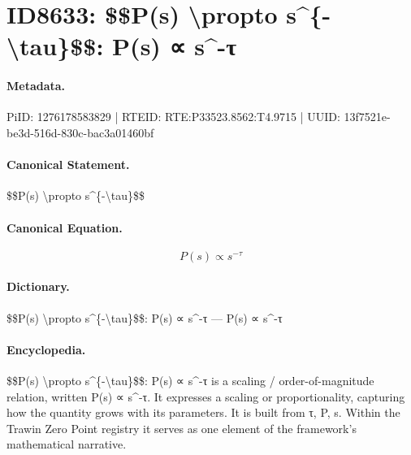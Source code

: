 \section*{ID8633: \$\$P(s) \textbackslash{}propto s\textasciicircum{}\{-\textbackslash{}tau\}\$\$: P(s) ∝ s\textasciicircum{}-τ}
\paragraph{Metadata.}
PiID: 1276178583829 | RTEID: RTE:P33523.8562:T4.9715 | UUID: 13f7521e-be3d-516d-830c-bac3a01460bf

\paragraph{Canonical Statement.}
\$\$P(s) \textbackslash{}propto s\textasciicircum{}\{-\textbackslash{}tau\}\$\$

\paragraph{Canonical Equation.}
\[
P(s) \propto s^{-\tau}
\]

\paragraph{Dictionary.}
\$\$P(s) \textbackslash{}propto s\textasciicircum{}\{-\textbackslash{}tau\}\$\$: P(s) ∝ s\textasciicircum{}-τ — P(s) ∝ s\textasciicircum{}-τ

\paragraph{Encyclopedia.}
\$\$P(s) \textbackslash{}propto s\textasciicircum{}\{-\textbackslash{}tau\}\$\$: P(s) ∝ s\textasciicircum{}-τ is a scaling / order-of-magnitude relation, written P(s) ∝ s\textasciicircum{}-τ. It expresses a scaling or proportionality, capturing how the quantity grows with its parameters. It is built from τ, P, s. Within the Trawin Zero Point registry it serves as one element of the framework's mathematical narrative.
